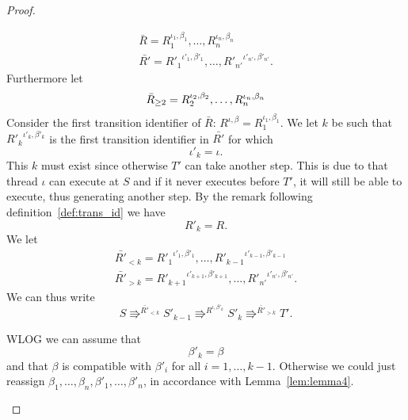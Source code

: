 \begin{proof}
\begin{description}
      \begin{equation*}
        \begin{gathered}
          \bar{R} = R_1^{\iota_1, \beta_1}, \dots, R_n^{\iota_n, \beta_n} \\
          \bar{R'} = {R'_1}^{\iota'_1, \beta'_1}, \dots, {R'_{n'}}^{\iota'_{n'},
          \beta'_{n'}}.
        \end{gathered}
      \end{equation*}
      Furthermore let
      \begin{equation*}
        \bar{R}_{\geq 2} = R_2^{\iota_2, \beta_2}, \dots, R_n^{\iota_n, \beta_n} \\
      \end{equation*}
      Consider the first transition identifier of $\bar{R}$: $R^{\iota, \beta} = R_1^{\iota_1,
      \beta_1}$. We let
      $k$ be such
      that ${R'_k}^{\iota'_k, \beta'_k}$ is the first transition identifier in
      $\bar{R'}$ for which 
      \begin{equation} \label{eq:qd1}
        \iota'_k = \iota.
      \end{equation} 
      This $k$ must exist since otherwise $T'$ can take another step. This is
      due to that thread $\iota$ can execute at $S$ and if it never executes
      before $T'$, it will still be able to execute, thus generating another
      step.  By the remark following definition~\ref{def:trans_id} we have 
      \begin{equation} \label{eq:qd2}
        R'_k = R.
      \end{equation} 
      We let
      \begin{equation*}
        \begin{gathered}
          \bar{R'}_{<k} = {R'_1}^{\iota'_1, \beta'_1}, \dots,
          {R'_{k-1}}^{\iota'_{k-1}, \beta'_{k-1}}  \\
          \bar{R'}_{>k} = {R'_{k+1}}^{\iota'_{k+1}, \beta'_{k+1}}, \dots,
          {R'_{n'}}^{\iota'_{n'}, \beta'_{n'}}.
        \end{gathered}
      \end{equation*}
      We can thus write
      \begin{equation} \label{eq:qd4}
        S \Rrightarrow^{\bar{R'}_{<k}} S'_{k-1} \Rrightarrow^{R^{\iota,
        \beta'_k}} S'_k \Rrightarrow^{\bar{R'}_{>k}} T'.
      \end{equation}

      WLOG we can assume that
      \begin{equation} \label{eq:qd3}
        \beta'_k = \beta
      \end{equation}
      and that $\beta$ is compatible with $\beta'_i$ for all $i = 1, \dots,
      k-1$.  Otherwise we could just reassign $\beta_1, \dots, \beta_n,
      \beta'_1, \dots, \beta'_n$, in accordance with Lemma~\ref{lem:lemma4}.


\end{description}
\end{proof}
